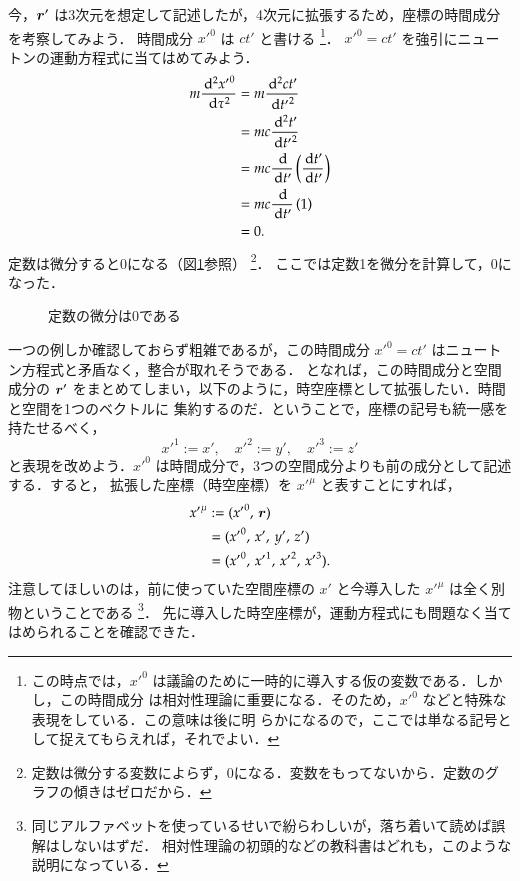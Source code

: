     今，$\boldsymbol{r}'$ は3次元を想定して記述したが，4次元に拡張するため，座標の時間成分を考察してみよう．
    時間成分 ${x'}^{0}$ は $ct'$ と書ける
        \footnote{
            この時点では，${x'}^{0}$ は議論のために一時的に導入する仮の変数である．しかし，この時間成分
            は相対性理論に重要になる．そのため，${x'}^{0}$ などと特殊な表現をしている．この意味は後に明
            らかになるので，ここでは単なる記号として捉えてもらえれば，それでよい．
        }．
    ${x'}^{0}=ct'$ を強引にニュートンの運動方程式に当てはめてみよう．
        \begin{align*}
            m \frac{\,\mathrm{d}^{2} {x'}^{0}}{\,\mathrm{d} \tau^{2}} &= m  \frac{\,\mathrm{d}^{2} ct'}{\,\mathrm{d} {t'}^{2}} \\
                                                    &= mc \frac{\,\mathrm{d}^{2}  t'}{\,\mathrm{d} {t'}^{2}} \\
                                                    &= mc \frac{\,\mathrm{d}}{\,\mathrm{d} t'} \left( \frac{\,\mathrm{d} t'}{\,\mathrm{d} t'} \right)\\
                                                    &= mc \frac{\,\mathrm{d}}{\,\mathrm{d} t'} \left( 1 \right) \\
                                                    &= 0.
        \end{align*}
    定数は微分すると0になる（図\ref{fig:const_graph_grad}参照）
        \footnote{
            定数は微分する変数によらず，0になる．変数をもってないから．定数のグラフの傾きはゼロだから．
        }．
    ここでは定数1を微分を計算して，0になった．
        \begin{figure}[hbt]
            \begin{center}
                \caption{定数の微分は0である}
                \label{fig:const_graph_grad}
            \end{center}
        \end{figure}

    一つの例しか確認しておらず粗雑であるが，この時間成分 ${x'}^{0}=ct'$ はニュートン方程式と矛盾なく，整合が取れそうである．
    となれば，この時間成分と空間成分の $\boldsymbol{r}'$ をまとめてしまい，以下のように，時空座標として拡張したい．時間と空間を1つのベクトルに
    集約するのだ．ということで，座標の記号も統一感を持たせるべく，
        \[
            {x'}^{1} := {x'}, \quad {x'}^{2} := {y'}, \quad {x'}^{3} := {z'}
        \]
    と表現を改めよう．${x'}^{0}$ は時間成分で，3つの空間成分よりも前の成分として記述する．すると，
    拡張した座標（時空座標）を ${x'}^{\mu}$ と表すことにすれば，
        \begin{align*}
            {x'}^{\mu} &:= ({x'}^{0},\,\boldsymbol{r}) \\
                       &=  ({x'}^{0},\,{x'},\,{y'},\,{z'}) \\
                       &=  ({x'}^{0},\,{x'}^{1},\,{x'}^{2},\,{x'}^{3}).
        \end{align*}
    注意してほしいのは，前に使っていた空間座標の $x'$ と今導入した ${x'}^{\mu}$ は全く別物ということである
        \footnote{
            同じアルファベットを使っているせいで紛らわしいが，落ち着いて読めば誤解はしないはずだ．
            相対性理論の初頭的などの教科書はどれも，このような説明になっている．
        }．
    先に導入した時空座標が，運動方程式にも問題なく当てはめられることを確認できた．

